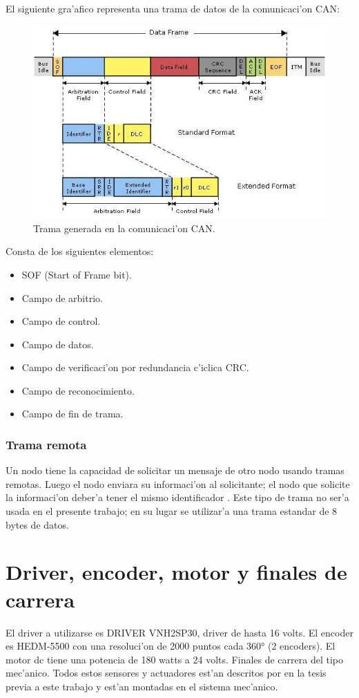 El siguiente gra'afico representa una trama de datos de la comunicaci'on CAN:

\begin{figure}[ht]
	\centering
		\includegraphics[scale=0.8]{tramacan}
	\caption{Trama generada en la comunicaci'on CAN\citep{garcia}.}
	\label{fig:tramacan}
\end{figure}

Consta de los siguientes elementos:

\begin{itemize}
\item SOF (Start of Frame bit).
\item Campo de arbitrio.
\item Campo de control.
\item Campo de datos.
\item Campo de verificaci'on por redundancia c'iclica CRC.
\item Campo de reconocimiento.
\item Campo de fin de trama.
\end{itemize}


\subsubsection{Trama remota}
Un nodo tiene la capacidad de solicitar un mensaje de otro nodo usando tramas remotas. Luego el nodo enviara su informaci'on al solicitante; el nodo que solicite la informaci'on deber'a tener el mismo identificador \citep{garcia}. Este tipo de trama no ser'a usada en el presente trabajo; en su lugar se utilizar'a una trama estandar de 8 bytes de datos.



\section{Driver, encoder, motor y finales de carrera}

El driver a utilizarse es DRIVER VNH2SP30, driver de hasta 16 volts. El encoder es HEDM-5500 con una resoluci'on de 2000 puntos cada 360° (2 encoders). El motor dc tiene una potencia de 180 watts a 24 volts. Finales de carrera del tipo mec'anico. Todos estos sensores y actuadores est'an descritos por \citet{montalvo} en la tesis previa a este trabajo y est'an montadas en el sistema mec'anico.